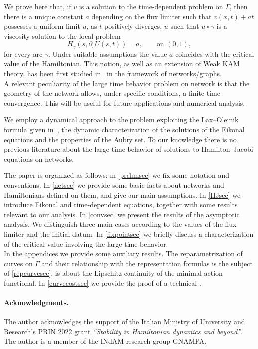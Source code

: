 \documentclass[11pt,a4paper,american]{article}
\begin{document}
    We prove here that, if $v$ is a solution to the time-dependent problem on $\Gamma$, then there is a unique constant $a$ depending on the flux limiter such that $v(x,t)+at$ possesses a uniform limit $u$, as $t$ positively diverges, $u$ such that $u\circ\gamma$ is a viscosity solution to the local problem
    \begin{equation*}
        H_\gamma(s,\partial_s U(s,t))=a,\qquad\text{on }(0,1),
    \end{equation*}
    for every arc $\gamma$. Under suitable assumptions the value $a$ coincides with the critical value of the Hamiltonian. This notion, as well as an extension of Weak KAM theory, has been first studied in~\cite{SiconolfiSorrentino18} in the framework of networks/graphs.\\
    A relevant peculiarity of the large time behavior problem on network is that the geometry of the network allows, under specific conditions, a finite time convergence. This will be useful for future applications and numerical analysis.

    We employ a dynamical approach to the problem exploiting the Lax--Oleinik formula given in~\cite{PozzaSiconolfi23}, the dynamic characterization of the solutions of the Eikonal equations and the properties of the Aubry set. To our knowledge there is no previous literature about the large time behavior of solutions to Hamilton--Jacobi equations on networks.

    The paper is organized as follows: in \cref{prelimsec} we fix some notation and conventions. In \cref{netsec} we provide some basic facts about networks and Hamiltonians defined on them, and give our main assumptions. In \cref{HJsec} we introduce Eikonal and time-dependent equations, together with some results relevant to our analysis. In \cref{convsec} we present the results of the asymptotic analysis. We distinguish three main cases according to the values of the flux limiter and the initial datum. In \cref{fixpointsec} we briefly discuss a characterization of the critical value involving the large time behavior.\\
    In the appendices we provide some auxiliary results. The reparametrization of curves on $\Gamma$ and their relationship with the representation formulas is the subject of \cref{repcurvesec}.  is about the Lipschitz continuity of the minimal action functional. In \cref{curvecostsec} we provide the proof of a technical .

    \paragraph{Acknowledgments.} The author acknowledges the support of the Italian Ministry of University and Research's PRIN 2022 grant \emph{``Stability in Hamiltonian dynamics and beyond''}. The author is a member of the INdAM research group GNAMPA.
\end{document}
